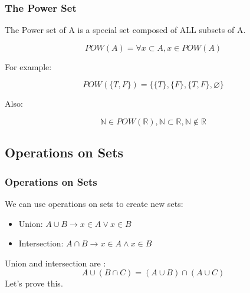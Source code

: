 \documentclass{beamer}
\begin{document}
\begin{frame}
  \frametitle{The Power Set}
  The Power set of A is a special set composed of ALL subsets of A.

  \begin{equation*}
    POW(A) = \forall x \subset A, x \in POW(A)
  \end{equation*}

  For example:

  \begin{equation*}
    POW(\{T,F\}) = \{\{T\},\{F\},\{T,F\},\varnothing\}
  \end{equation*}

  Also:

  \begin{equation*}
    \mathbb{N} \in POW(\mathbb{R}), \mathbb{N} \subset \mathbb{R}, \mathbb{N} \notin \mathbb{R}
  \end{equation*}
\end{frame}

\subsection{Operations on Sets}

\begin{frame}
  \frametitle{Operations on Sets}

  {\larger
    We can use operations on sets to create new sets:
    \begin{itemize}
    \item Union: $A \cup B \rightarrow x \in A \lor x \in B$
    \item Intersection: $A \cap B \rightarrow x \in A \land x \in B$
    \end{itemize}

    \bigskip
    
    Union and intersection are :
    \begin{equation*}
      A \cup (B \cap C) = (A \cup B) \cap (A \cup C)
    \end{equation*}
    Let's prove this.

  }
\end{frame}
\end{document}
